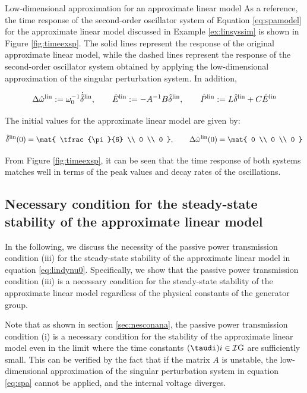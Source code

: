\documentclass[graybox, envcountchap]{svmult}
\begin{document}
\begin{example}{Low-dimensional approximation for an approximate linear model}
As a reference, the time response of the second-order oscillator system of
Equation \ref{eq:spamodel} for the approximate linear model discussed in Example
\ref{ex:linsyssim} is shown in Figure \ref{fig:timeexsp}. The solid lines
represent the response of the original approximate linear model, while the
dashed lines represent the response of the second-order oscillator system
obtained by applying the low-dimensional approximation of the singular
perturbation system. In addition,

\[
  \Delta \hat{\omega}^{\rm lin}:=\omega_0^{-1} \dot{\hat{\delta}}^{\rm lin},\qquad
  \hat{E}^{\rm lin}:=-A^{-1}B\hat{\delta}^{\rm lin},\qquad
  \hat{P}^{\rm lin}:= L \hat{\delta}^{\rm lin} + C \hat{E}^{\rm lin}
\]

The initial values for the approximate linear model are given by:

\[
  \hat{\delta}^{\rm lin}(0)
  =
  \mat{
  \tfrac{\pi}{6} \\
  0 \\
  0
  },\qquad
  \Delta \hat{\omega}^{\rm lin}(0)
  =
  \mat{
  0 \\
  0 \\
  0
  }
\]

From Figure \ref{fig:timeexsp}, it can be seen that the time response of both
systems matches well in terms of the peak values and decay rates of the
oscillations.
\end{example}

\subsection{Necessary condition for the steady-state stability of the
approximate linear model }\label{sec:nesconsta}
In the following, we discuss the necessity of the passive power transmission
condition (iii) for the steady-state stability of the approximate linear model
in equation \ref{eq:lindynu0}.  Specifically, we show that the passive power
transmission condition (iii) is a necessary condition for the steady-state
stability of the approximate linear model regardless of the physical constants
of the generator group.

Note that as shown in section \ref{sec:nesconana}, the passive power
transmission condition (i) is a necessary condition for the stability of the
approximate linear model even in the limit where the time constants $(\taudi){i
\in \mathcal{I}{\rm G}}$ are sufficiently small.  This can be verified by the
fact that if the matrix $A$ is unstable, the low-dimensional approximation of
the singular perturbation system in equation \ref{eq:spa} cannot be applied, and
the internal voltage diverges.
\end{document}
